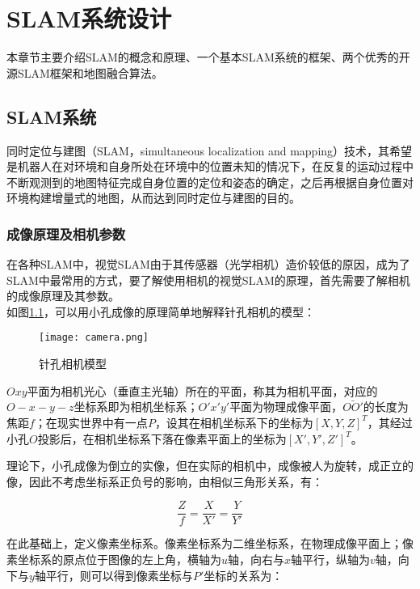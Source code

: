 \renewcommand{\baselinestretch}{1.5}
\fontsize{12pt}{13pt}\selectfont

\chapter{SLAM系统设计} \label{System Overview}
本章节主要介绍SLAM的概念和原理、一个基本SLAM系统的框架、两个优秀的开源SLAM框架和地图融合算法。

\section{SLAM系统}
同时定位与建图（SLAM，simultaneous localization and mapping）技术，其希望是机器人在对环境和自身所处在环境中的位置未知的情况下，在反复的运动过程中不断观测到的地图特征完成自身位置的定位和姿态的确定，之后再根据自身位置对环境构建增量式的地图，从而达到同时定位与建图的目的。


\subsection{成像原理及相机参数} \label{3.1.2}
在各种SLAM中，视觉SLAM由于其传感器（光学相机）造价较低的原因，成为了SLAM中最常用的方式，要了解使用相机的视觉SLAM的原理，首先需要了解相机的成像原理及其参数。
~\\
如图\ref{fig4}，可以用小孔成像的原理简单地解释针孔相机的模型：
\begin{figure}[!ht]
	\centering
	\texttt{[image: camera.png]}
	\caption{针孔相机模型} 
	\label{fig4}
\end{figure}

$Oxy$平面为相机光心（垂直主光轴）所在的平面，称其为相机平面，对应的$O-x-y-z$坐标系即为相机坐标系；$O'x'y'$平面为物理成像平面，$\bar{OO'}$的长度为焦距$f$；在现实世界中有一点$P$，设其在相机坐标系下的坐标为$[X, Y, Z]^T$，其经过小孔$O$投影后，在相机坐标系下落在像素平面上的坐标为$[X', Y', Z']^T$。

理论下，小孔成像为倒立的实像，但在实际的相机中，成像被人为旋转，成正立的像，因此不考虑坐标系正负号的影响，由相似三角形关系，有：

\begin{equation}
\frac{Z}{f}=\frac{X}{X'}=\frac{Y}{Y'}
\end{equation}


在此基础上，定义像素坐标系。像素坐标系为二维坐标系，在物理成像平面上；像素坐标系的原点位于图像的左上角，横轴为$u$轴，向右与$x$轴平行，纵轴为$v$轴，向下与$y$轴平行，则可以得到像素坐标与$P'$坐标的关系为：

